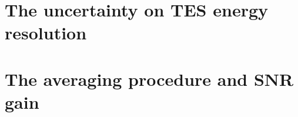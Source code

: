 \appendix
\chapter{The uncertainty on TES energy resolution} \label{uncert_deltaE}


\chapter{The averaging procedure and SNR gain} \label{sect:averaging}